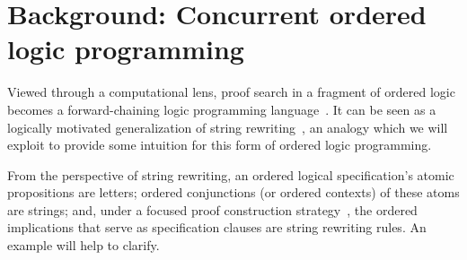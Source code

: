\documentclass[
  class=../hdeyoung-proposal,
  crop=false
]{standalone}
\begin{document}
\section{Background: Concurrent ordered logic programming}\label{sec:ordered-lp}

Viewed through a computational lens, proof search in a fragment of ordered logic becomes a forward-chaining logic programming language~\autocite{Pfenning+Simmons:LICS09}.
It can be seen as a logically motivated generalization of string rewriting~\autocite[see, \eg,][]{Book+Otto:SRS93}, an analogy which we will exploit to provide some intuition for this form of ordered logic programming.

From the perspective of string rewriting, an ordered logical specification's atomic propositions are letters; ordered conjunctions (or ordered contexts) of these atoms are strings; and, under a focused proof construction strategy~\autocite{Andreoli:JLC92}, the ordered implications that serve as specification clauses are string rewriting rules.
An example will help to clarify.





\end{document}
